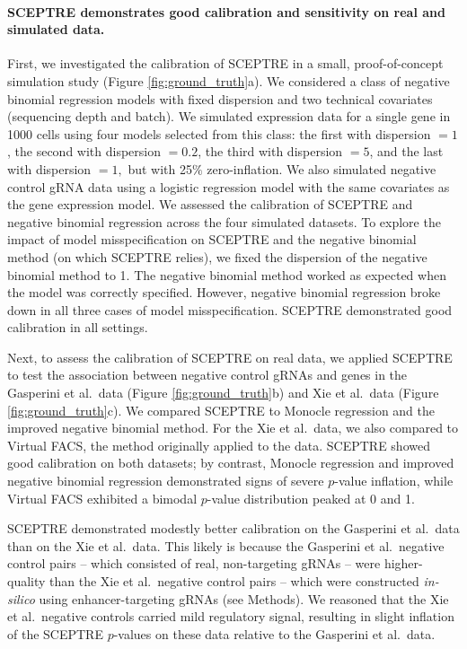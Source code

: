 \documentclass{article}
\begin{document}
\paragraph{SCEPTRE demonstrates good calibration and sensitivity on real and simulated data.} 

First, we investigated the calibration of SCEPTRE in a small, proof-of-concept simulation study (Figure \ref{fig:ground_truth}a). We considered a class of negative binomial regression models with fixed dispersion and two technical covariates (sequencing depth and batch). We simulated expression data for a single gene in 1000 cells using four models selected from this class: the first with  dispersion $= 1$, the second with dispersion $= 0.2$, the third with dispersion $= 5$, and the last with dispersion $= 1,$ but with 25$\%$ zero-inflation. We also simulated negative control gRNA data using a logistic regression model with the same covariates as the gene expression model. We assessed the calibration of SCEPTRE and negative binomial regression across the four simulated datasets. To explore the impact of model misspecification on SCEPTRE and the negative binomial method (on which SCEPTRE relies), we fixed the dispersion of the negative binomial method to 1. The negative binomial method worked as expected when the model was correctly specified. However, negative binomial regression broke down in all three cases of model misspecification. SCEPTRE demonstrated good calibration in all settings.

Next, to assess the calibration of SCEPTRE on real data, we applied SCEPTRE to test the association between negative control gRNAs and genes in the Gasperini et al.\ data (Figure \ref{fig:ground_truth}b) and Xie et al.\ data (Figure \ref{fig:ground_truth}c). We compared SCEPTRE to Monocle regression and the improved negative binomial method. For the Xie et al.\ data, we also compared to Virtual FACS, the method originally applied to the data. SCEPTRE showed good calibration on both datasets; by contrast, Monocle regression and improved negative binomial regression demonstrated signs of severe $p$-value inflation, while Virtual FACS exhibited a bimodal $p$-value distribution peaked at 0 and 1.

SCEPTRE demonstrated modestly better calibration on the Gasperini et al.\ data than on the Xie et al.\ data. This likely is because the Gasperini et al.\ negative control pairs -- which consisted of real, non-targeting gRNAs -- were higher-quality than the Xie et al.\ negative control pairs  -- which were constructed \textit{in-silico} using enhancer-targeting gRNAs (see Methods). We reasoned that the Xie et al.\ negative controls carried mild regulatory signal, resulting in slight inflation of the SCEPTRE $p$-values on these data relative to the Gasperini et al.\ data.
\end{document}
